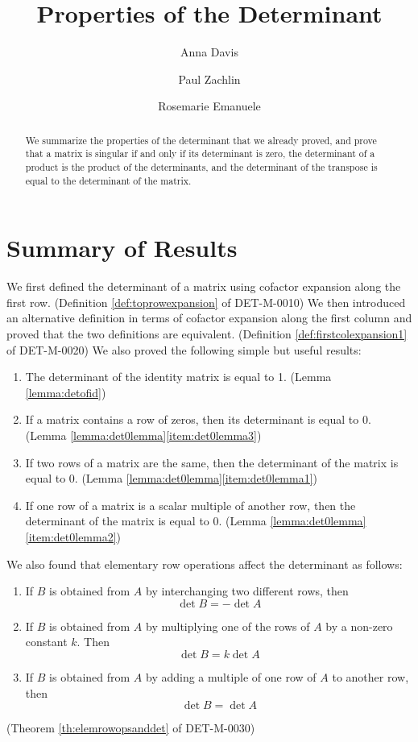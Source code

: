\documentclass{ximera}
\author{Anna Davis \and Paul Zachlin \and Rosemarie Emanuele} \title{Properties of the Determinant} \license{CC-BY 4.0}
\begin{document}
\begin{abstract}
 We summarize the properties of the determinant that we already proved, and prove that a matrix is singular if and only if its determinant is zero, the determinant of a product is the product of the determinants, and the determinant of the transpose is equal to the determinant of the matrix.
\end{abstract}
\maketitle
\section*{Summary of Results}
We first defined the determinant of a matrix using cofactor expansion along the first row. (Definition \ref{def:toprowexpansion} of DET-M-0010)  We then introduced an alternative definition in terms of cofactor expansion along the first column and proved that the two definitions are equivalent. (Definition \ref{def:firstcolexpansion1} of DET-M-0020)  We also proved the following simple but useful results:
\begin{enumerate}
\item The determinant of the identity matrix is equal to 1. (Lemma \ref{lemma:detofid})

\item If a matrix contains a row of zeros, then its determinant is equal to 0. (Lemma \ref{lemma:det0lemma}\ref{item:det0lemma3})
\item If two rows of a matrix are the same, then the determinant of the matrix is equal to 0.  (Lemma \ref{lemma:det0lemma}\ref{item:det0lemma1})
\item If one row of a matrix is a scalar multiple of another row, then the determinant of the matrix is equal to 0. (Lemma \ref{lemma:det0lemma}\ref{item:det0lemma2})
\end{enumerate}
We also found that elementary row operations affect the determinant as follows:
\begin{enumerate}
\item
If $B$ is obtained from $A$ by interchanging two different rows, then $$\det{B}=-\det{A}$$
\item 
If $B$ is obtained from $A$ by multiplying one of the rows of $A$ by a non-zero constant $k$.  Then $$\det{B}=k\det{A}$$
\item 
If $B$ is obtained from $A$ by adding a multiple of one row of $A$ to another row, then
$$\det{B}=\det{A}$$
\end{enumerate}
(Theorem \ref{th:elemrowopsanddet} of DET-M-0030)
\end{document}
